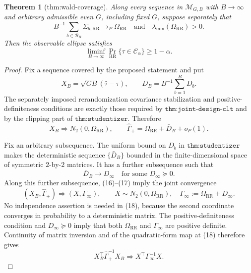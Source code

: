 \documentclass{article}
\newtheorem{theorem}{Theorem}
\begin{document}
\begin{theorem}[thm:wald-coverage]\label{thm:wald-coverage}
Along every sequence in \(\mathcal M_{G,B}\) with \(B\to\infty\) and arbitrary admissible even \(G\), including fixed \(G\), suppose separately that
\[
B^{-1}\sum_{b\in\mathcal B_B}\Sigma_{b,\mathrm{RR}}\to_P\Omega_{\mathrm{RR}}
\quad\text{and}\quad
\lambda_{\min}(\Omega_{\mathrm{RR}})>0.
\]
Then the observable ellipse satisfies
\[
\liminf_{B\to\infty}\Pr_{\mathrm{RR}}\{\tau\in\mathcal C_\alpha\}\geq1-\alpha.
\]
\end{theorem}
\begin{proof}
Fix a sequence covered by the proposed statement and put
\[
 X_B=\sqrt{GB}(\widehat\tau-\tau),
 \qquad
 \bar D_B=B^{-1}\sum_{b=1}^BD_b.
\]
The separately imposed rerandomization covariance stabilization and positive-definiteness conditions are exactly those required by \(\texttt{thm:joint-design-clt}\) and by the clipping part of \(\texttt{thm:studentizer}\).  Therefore
\[
 X_B\Rightarrow N_2(0,\Omega_{\mathrm{RR}}),
 \qquad
 \widehat\Gamma_+
 =\Omega_{\mathrm{RR}}+\bar D_B+o_P(1).                    \tag{16}
\]

Fix an arbitrary subsequence.  The uniform bound on \(D_b\) in \(\texttt{thm:studentizer}\) makes the deterministic sequence \(\{\bar D_B\}\) bounded in the finite-dimensional space of symmetric \(2\)-by-\(2\) matrices.  It has a further subsequence such that
\[
 \bar D_B\longrightarrow D_\infty
 \quad\text{for some }D_\infty\succeq0.                  \tag{17}
\]
Along this further subsequence, (16)--(17) imply the joint convergence
\[
 (X_B,\widehat\Gamma_+)\Rightarrow(X,\Gamma_\infty),
 \qquad
 X\sim N_2(0,\Omega_{\mathrm{RR}}),
 \quad
 \Gamma_\infty:=\Omega_{\mathrm{RR}}+D_\infty.           \tag{18}
\]
No independence assertion is needed in (18), because the second coordinate converges in probability to a deterministic matrix.  The positive-definiteness condition and \(D_\infty\succeq0\) imply that both \(\Omega_{\mathrm{RR}}\) and \(\Gamma_\infty\) are positive definite.  Continuity of matrix inversion and of the quadratic-form map at (18) therefore gives
\[
 X_B^\top\widehat\Gamma_+^{-1}X_B
 \Rightarrow X^\top\Gamma_\infty^{-1}X.                  \tag{19}
\]


\end{proof}
\end{document}
